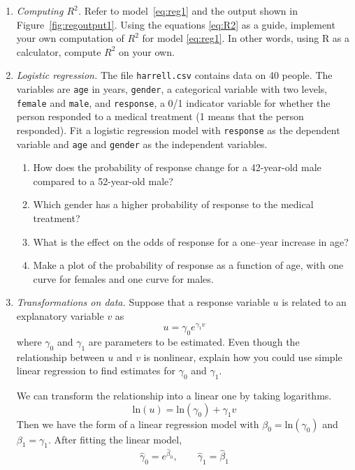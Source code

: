 \begin{enumerate}
\item \emph{Computing $R^2$.} Refer to model~\ref{eq:reg1} and the 
output shown in Figure~\ref{fig:regoutput1}. Using the equations
\ref{eq:R2} as a guide, implement your own computation of $R^2$ for
model \ref{eq:reg1}. In other words, using R as a calculator,
compute $R^2$ on your own.

\item \emph{Logistic regression.} The file \texttt{harrell.csv}
contains data on 40 people. The variables are \texttt{age} in years,
\texttt{gender}, a categorical variable with two levels, \texttt{female}
and \texttt{male}, and \texttt{response}, a 0/1 indicator variable for
whether the person responded to a medical treatment (1 means that the
person responded). Fit a logistic regression model with
\texttt{response} as the dependent variable and \texttt{age} and
\texttt{gender} as the independent variables.

\begin{enumerate}
\item How does the probability of response change for a 42-year-old male
compared to a 52-year-old male?
\item Which gender has a higher probability of response to the medical
treatment?
\item What is the effect on the odds of response for a one--year
increase in age?
\item Make a plot of the probability of response as a function
of age, with one curve for females and one curve for males.
\end{enumerate}

\item \emph{Transformations on data.}
  Suppose that a response variable $u$ is related to an explanatory variable $v$ as
\[
u = \gamma_0e^{\gamma_1v}
\]
where $\gamma_0$ and $\gamma_1$ are parameters to be estimated.  Even
though the relationship between $u$ and $v$ is nonlinear, explain how
you could use simple linear regression to find estimates for
$\gamma_0$ and $\gamma_1$.

\begin{solution}
\bs
We can transform the relationship into a linear one
by taking logarithms.
\[
\text{ln}(u) = \text{ln}(\gamma_0) + \gamma_1v
\]
Then we have the form of a linear regression model with $\beta_0 = \text{ln}(\gamma_0)$
and $\beta_1 = \gamma_1$. After fitting the linear model,
\[
\hat{\gamma}_0=e^{\hat{\beta}_0}, \qquad \hat{\gamma}_1 = \hat{\beta}_1
\]
\end{solution}


\end{enumerate}
